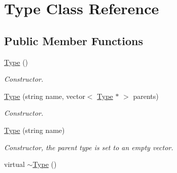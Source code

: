 \hypertarget{classType}{\section{Type Class Reference}
\label{classType}
}
\subsection*{Public Member Functions}
\begin{DoxyCompactItemize}
\item 
\hypertarget{classType_a78339313d36891f18427c431ea84e306}{\hyperlink{classType_a78339313d36891f18427c431ea84e306}{Type} ()}\label{classType_a78339313d36891f18427c431ea84e306}

\begin{DoxyCompactList}\small\item\em Constructor. \end{DoxyCompactList}\item 
\hyperlink{classType_aa4810683e26c16eb59e71d28a45e558f}{Type} (string name, vector$<$ \hyperlink{classType}{Type} $\ast$ $>$ parents)
\begin{DoxyCompactList}\small\item\em Constructor. \end{DoxyCompactList}\item 
\hyperlink{classType_a58ff228c4b6fdace44ef1253b06dc51f}{Type} (string name)
\begin{DoxyCompactList}\small\item\em Constructor, the parent type is set to an empty vector. \end{DoxyCompactList}\item 
\hypertarget{classType_a79b5e86eb2dd658180797a1b798194a8}{virtual \hyperlink{classType_a79b5e86eb2dd658180797a1b798194a8}{$\sim$\+Type} ()}\label{classType_a79b5e86eb2dd658180797a1b798194a8}


\end{DoxyCompactItemize}
